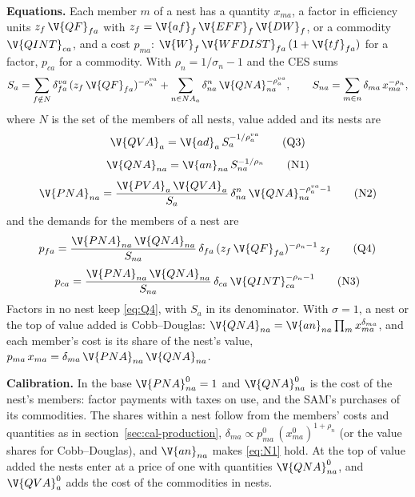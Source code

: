 \textbf{Equations.} Each member $m$ of a nest has a quantity $x_{ma}$, a factor
in efficiency units $z_f\,\V{QF}_{fa}$ with $z_f = \V{af}_f\,\V{EFF}_f\,\V{DW}_f$,
or a commodity $\V{QINT}_{ca}$, and a cost $p_{ma}$:
$\V{W}_f\,\V{WFDIST}_{fa}\,(1 + \V{tf}_{fa})$ for a factor, $p_{ca}$ for a
commodity. With $\rho_n = 1/\sigma_n - 1$ and the CES sums
\begin{equation*}
S_a = \sum_{f \notin N} \delta^{va}_{fa}\,(z_f\,\V{QF}_{fa})^{-\rho^{va}_a}
  + \sum_{n \in NA_a} \delta^n_{na}\,\V{QNA}_{na}^{-\rho^{va}_a},
\qquad
S_{na} = \sum_{m \in n} \delta_{ma}\,x_{ma}^{-\rho_n},
\end{equation*}
where $N$ is the set of the members of all nests, value added and its nests are
\begin{equation*}
\V{QVA}_a = \V{ad}_a\,S_a^{-1/\rho^{va}_a}
\tag{Q3}
\end{equation*}
\begin{equation}
\V{QNA}_{na} = \V{an}_{na}\,S_{na}^{-1/\rho_n}
\tag{N1}\label{eq:N1}
\end{equation}
\begin{equation}
\V{PNA}_{na} = \frac{\V{PVA}_a\,\V{QVA}_a}{S_a}\,\delta^n_{na}\,\V{QNA}_{na}^{-\rho^{va}_a - 1}
\tag{N2}\label{eq:N2}
\end{equation}
and the demands for the members of a nest are
\begin{equation*}
p_{fa} = \frac{\V{PNA}_{na}\,\V{QNA}_{na}}{S_{na}}\,\delta_{fa}\,(z_f\,\V{QF}_{fa})^{-\rho_n - 1}\,z_f
\tag{Q4}
\end{equation*}
\begin{equation}
p_{ca} = \frac{\V{PNA}_{na}\,\V{QNA}_{na}}{S_{na}}\,\delta_{ca}\,\V{QINT}_{ca}^{-\rho_n - 1}
\tag{N3}\label{eq:N3}
\end{equation}
Factors in no nest keep \eqref{eq:Q4}, with $S_a$ in its denominator. With
$\sigma = 1$, a nest or the top of value added is Cobb--Douglas:
$\V{QNA}_{na} = \V{an}_{na} \prod_m x_{ma}^{\delta_{ma}}$, and each member's
cost is its share of the nest's value, $p_{ma}\,x_{ma} = \delta_{ma}\,\V{PNA}_{na}\,\V{QNA}_{na}$.

\textbf{Calibration.} In the base $\V{PNA}^0_{na} = 1$ and $\V{QNA}^0_{na}$ is
the cost of the nest's members: factor payments with taxes on use, and the
SAM's purchases of its commodities. The shares within a nest follow from the
members' costs and quantities as in section~\ref{sec:cal-production},
$\delta_{ma} \propto p^0_{ma}\,(x^0_{ma})^{1 + \rho_n}$ (or the value shares for
Cobb--Douglas), and $\V{an}_{na}$ makes \eqref{eq:N1} hold. At the top of value
added the nests enter at a price of one with quantities $\V{QNA}^0_{na}$, and
$\V{QVA}^0_a$ adds the cost of the commodities in nests.

